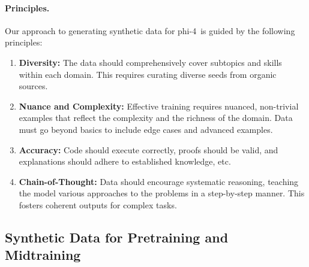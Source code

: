 \documentclass[11pt]{article}
\newcommand{\modelwithoutspace}{\textsf{phi-4}}
\newcommand{\model}{\modelwithoutspace~}
\begin{document}
\paragraph{Principles.} Our approach to generating synthetic data for \model is guided by the following principles:
\begin{enumerate}
    \item \textbf{Diversity:} The data should comprehensively cover subtopics and skills within each domain. This requires curating diverse seeds from organic sources.
    \item \textbf{Nuance and Complexity:} Effective training requires nuanced, non-trivial examples that reflect the complexity and the richness of the domain. Data must go beyond basics to include edge cases and advanced examples.
    \item \textbf{Accuracy:} Code should execute correctly, proofs should be valid, and explanations should adhere to established knowledge, etc.
    \item \textbf{Chain-of-Thought:} Data should encourage systematic reasoning, teaching the model various approaches to the problems in a step-by-step manner. This fosters coherent outputs for complex tasks.
\end{enumerate}

\subsection{Synthetic Data for Pretraining and Midtraining}
\end{document}
